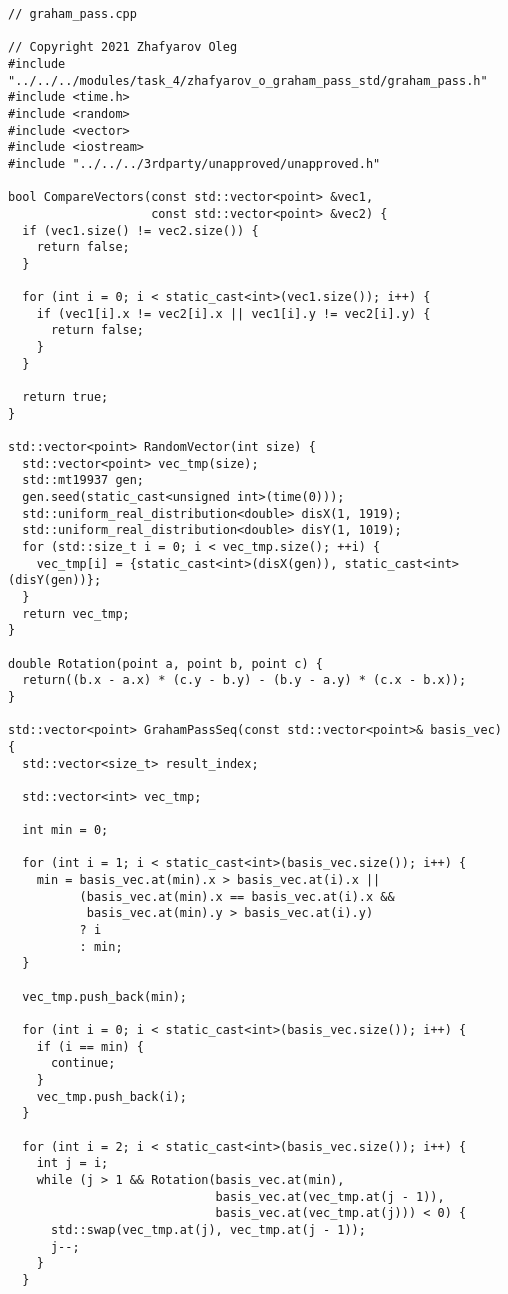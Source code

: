\documentclass{report}
\begin{document}
\begin{lstlisting}
// graham_pass.cpp

// Copyright 2021 Zhafyarov Oleg
#include "../../../modules/task_4/zhafyarov_o_graham_pass_std/graham_pass.h"
#include <time.h>
#include <random>
#include <vector>
#include <iostream>
#include "../../../3rdparty/unapproved/unapproved.h"

bool CompareVectors(const std::vector<point> &vec1,
                    const std::vector<point> &vec2) {
  if (vec1.size() != vec2.size()) {
    return false;
  }

  for (int i = 0; i < static_cast<int>(vec1.size()); i++) {
    if (vec1[i].x != vec2[i].x || vec1[i].y != vec2[i].y) {
      return false;
    }
  }

  return true;
}

std::vector<point> RandomVector(int size) {
  std::vector<point> vec_tmp(size);
  std::mt19937 gen;
  gen.seed(static_cast<unsigned int>(time(0)));
  std::uniform_real_distribution<double> disX(1, 1919);
  std::uniform_real_distribution<double> disY(1, 1019);
  for (std::size_t i = 0; i < vec_tmp.size(); ++i) {
    vec_tmp[i] = {static_cast<int>(disX(gen)), static_cast<int>(disY(gen))};
  }
  return vec_tmp;
}

double Rotation(point a, point b, point c) {
  return((b.x - a.x) * (c.y - b.y) - (b.y - a.y) * (c.x - b.x));
}

std::vector<point> GrahamPassSeq(const std::vector<point>& basis_vec) {
  std::vector<size_t> result_index;

  std::vector<int> vec_tmp;

  int min = 0;

  for (int i = 1; i < static_cast<int>(basis_vec.size()); i++) {
    min = basis_vec.at(min).x > basis_vec.at(i).x ||
          (basis_vec.at(min).x == basis_vec.at(i).x &&
           basis_vec.at(min).y > basis_vec.at(i).y)
          ? i
          : min;
  }

  vec_tmp.push_back(min);

  for (int i = 0; i < static_cast<int>(basis_vec.size()); i++) {
    if (i == min) {
      continue;
    }
    vec_tmp.push_back(i);
  }

  for (int i = 2; i < static_cast<int>(basis_vec.size()); i++) {
    int j = i;
    while (j > 1 && Rotation(basis_vec.at(min),
                             basis_vec.at(vec_tmp.at(j - 1)),
                             basis_vec.at(vec_tmp.at(j))) < 0) {
      std::swap(vec_tmp.at(j), vec_tmp.at(j - 1));
      j--;
    }
  }


\end{lstlisting}
\end{document}
